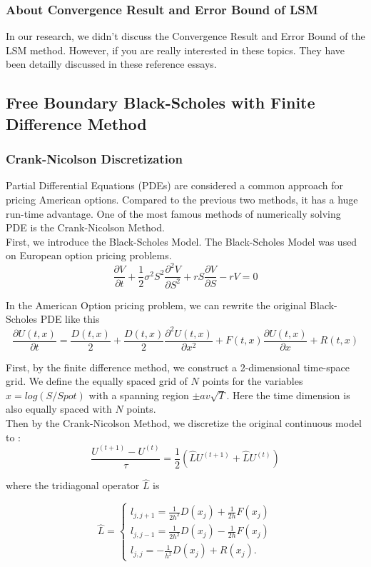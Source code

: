 \documentclass{article}
\begin{document}
\subsubsection{About Convergence Result and Error Bound of LSM}
In our research, we didn't discuss the  Convergence Result and Error Bound of the LSM method. However, if you are really interested in these topics. They have been detailly discussed in these reference essays.\cite{LS}\cite{TJB}

\subsection{Free Boundary Black-Scholes with Finite Difference Method}
\subsubsection{Crank-Nicolson Discretization}
Partial Differential Equations (PDEs) are considered a common approach for pricing American options. Compared to the previous two methods, it has a huge run-time advantage. One of the most famous methods of numerically solving PDE is the Crank-Nicolson Method. \\

First, we introduce the Black-Scholes Model. The Black-Scholes Model was used on European option pricing problems. 
$$\frac{\partial V}{\partial t} + \frac{1}{2} \sigma^2 S^2 \frac{\partial^2 V}{\partial S^2} + rS \frac{\partial V}{\partial S} - rV = 0$$

 In the American Option pricing problem, we can rewrite the original Black-Scholes PDE like this $$\frac{\partial U(t,x)}{\partial t}  = \frac{D(t,x)}{2}+ \frac{D(t,x)}{2}  \frac{\partial^2 U(t,x)}{\partial x^2} + F(t,x) \frac{\partial U(t,x)}{\partial x} + R(t,x) $$ 
 
First, by the finite difference method, we construct a 2-dimensional time-space grid. We define the equally spaced grid of $N$ points for the variables $x = log(S/Spot)$ with a spanning region $\pm av\sqrt{T}$. Here the time dimension is also equally spaced with $N$ points.\\

Then by the Crank-Nicolson Method, we discretize the original continuous model to :
$$\frac{U^{(t+1)} - U^{(t)}}{\tau} = \frac{1}{2}( \hat{L}U^{(t+1)} + \hat{L}U^{(t)})$$

where the tridiagonal operator $\hat{L}$ is 

\begin{equation}
  \hat L=\begin{cases}
    l_{j,j+1} = \frac{1}{2h^2}D(x_j)+\frac{1}{2h}F(x_j)\\
    l_{j,j-1} = \frac{1}{2h^2}D(x_j)-\frac{1}{2h}F(x_j)\\
   l_{j,j} = -\frac{1}{h^2}D(x_j)+R(x_j).
  \end{cases}
\end{equation}
\end{document}
